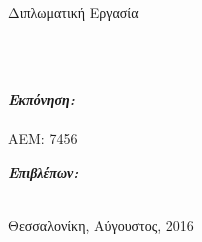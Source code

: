 \documentclass[
11pt, %
twoside, %
english,
headsepline, %
]{MastersDoctoralThesis} %
\author{Κούρος Γεώργιος}
\begin{document}
\frontmatter %
\pagestyle{plain}



\begin{titlepage}
\begin{center}

\\[0.2cm]

{\large \univname}\\ [0.2cm]
{\large \facname}\\ [0.2cm]
\deptname\\
\groupname\\[3cm]


{\LARGE Διπλωματική Εργασία}\\[1cm] %

\HRule \\[0.4cm] %
{\huge \bfseries \ttitle\par}\vspace{0.4cm} %
\HRule \\[3cm] %

\begin{minipage}[t]{0.4\textwidth}
\begin{flushleft} \large
\emph{\textbf{Εκπόνηση:}}\\ 
\authorname\\
ΑΕΜ: 7456
\end{flushleft}
\end{minipage}
\begin{minipage}[t]{0.4\textwidth}
\begin{flushright} \large
\emph{\textbf{Επιβλέπων:}} \\
\supname %
\end{flushright}
\end{minipage}\\[3cm]


\vfill
{\large Θεσσαλονίκη, Αύγουστος, 2016} %
\end{center}
\end{titlepage}
\end{document}
